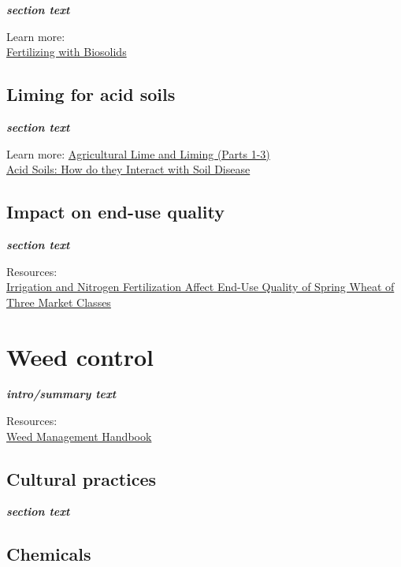 \documentclass[
  letterpaper,
  DIV=11,
  numbers=noendperiod]{scrreprt}
\begin{document}
\textbf{\emph{section text}}

Learn more:\\
\href{https://extension.oregonstate.edu/catalog/pub/pnw-508-fertilizing-biosolids}{Fertilizing
with Biosolids}

\section{Liming for acid soils}\label{liming-for-acid-soils}

\textbf{\emph{section text}}

Learn more:
\href{https://pubs.extension.wsu.edu/agriculture-lime-and-liming-part-1-introduction-to-agricultural-lime-and-liming-soil-acidification-series}{Agricultural
Lime and Liming (Parts 1-3)}\\
\href{https://pubs.extension.wsu.edu/acid-soils-how-do-they-interact-with-root-diseases-soil-acidification-series}{Acid
Soils: How do they Interact with Soil Disease}

\section{Impact on end-use quality}\label{impact-on-end-use-quality}

\textbf{\emph{section text}}

Resources:\\
\href{https://www.uidaho.edu/extension/publications/bul/bul957}{Irrigation
and Nitrogen Fertilization Affect End-Use Quality of Spring Wheat of
Three Market Classes}


\chapter{Weed control}\label{weed-control}

\textbf{\emph{intro/summary text}}

Resources:\\
\href{https://pnwhandbooks.org/weed}{Weed Management Handbook}

\section{Cultural practices}\label{cultural-practices}

\textbf{\emph{section text}}

\section{Chemicals}\label{chemicals}
\end{document}
